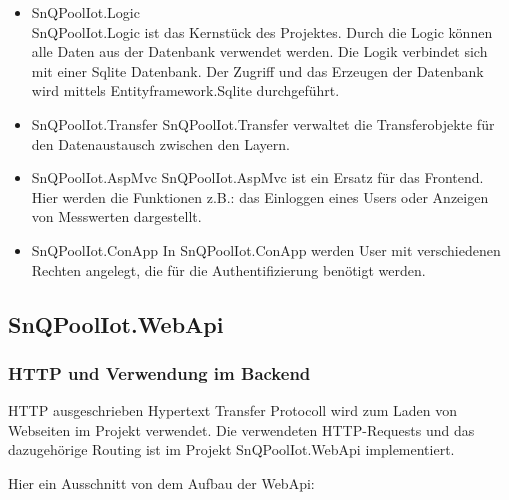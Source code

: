 \begin{itemize}
    \item SnQPoolIot.Logic
    \\
    SnQPoolIot.Logic ist das Kernstück des Projektes. 
    Durch die Logic können alle Daten aus der Datenbank verwendet werden. 
    Die Logik verbindet sich mit einer Sqlite Datenbank. Der Zugriff und das Erzeugen der Datenbank wird mittels Entityframework.Sqlite durchgeführt.
\end{itemize}

\begin{itemize}
    \item SnQPoolIot.Transfer
    SnQPoolIot.Transfer verwaltet die Transferobjekte für den Datenaustausch zwischen den Layern.
\end{itemize}


\begin{itemize}
    \item SnQPoolIot.AspMvc
    SnQPoolIot.AspMvc ist ein Ersatz für das Frontend.
    Hier werden die Funktionen z.B.: das Einloggen eines Users oder Anzeigen von Messwerten dargestellt.
\end{itemize}

\begin{itemize}
    \item SnQPoolIot.ConApp
    In SnQPoolIot.ConApp werden User mit verschiedenen Rechten angelegt, die für die Authentifizierung benötigt werden.
\end{itemize}




\subsection{SnQPoolIot.WebApi}

\subsubsection*{HTTP und Verwendung im Backend}

HTTP ausgeschrieben Hypertext Transfer Protocoll wird zum Laden von Webseiten im Projekt verwendet.
Die verwendeten HTTP-Requests und das dazugehörige Routing ist im Projekt SnQPoolIot.WebApi implementiert.

Hier ein Ausschnitt von dem Aufbau der WebApi:

